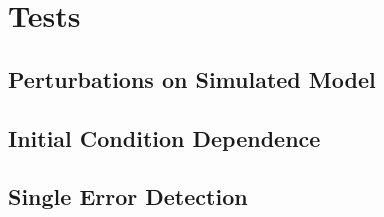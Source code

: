 \section{Tests}
\subsection{Perturbations on Simulated Model}
\subsection{Initial Condition Dependence}
\subsection{Single Error Detection}
